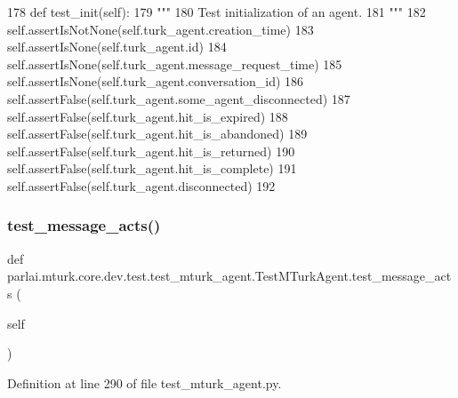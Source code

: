 \begin{DoxyCode}
178     \textcolor{keyword}{def }test\_init(self):
179         \textcolor{stringliteral}{"""}
180 \textcolor{stringliteral}{        Test initialization of an agent.}
181 \textcolor{stringliteral}{        """}
182         self.assertIsNotNone(self.turk\_agent.creation\_time)
183         self.assertIsNone(self.turk\_agent.id)
184         self.assertIsNone(self.turk\_agent.message\_request\_time)
185         self.assertIsNone(self.turk\_agent.conversation\_id)
186         self.assertFalse(self.turk\_agent.some\_agent\_disconnected)
187         self.assertFalse(self.turk\_agent.hit\_is\_expired)
188         self.assertFalse(self.turk\_agent.hit\_is\_abandoned)
189         self.assertFalse(self.turk\_agent.hit\_is\_returned)
190         self.assertFalse(self.turk\_agent.hit\_is\_complete)
191         self.assertFalse(self.turk\_agent.disconnected)
192 
\end{DoxyCode}
\mbox{\label{classparlai_1_1mturk_1_1core_1_1dev_1_1test_1_1test__mturk__agent_1_1TestMTurkAgent_ad7bb0c1f6343a03be96731bd27670b3b}} 
\subsubsection{\texorpdfstring{test\+\_\+message\+\_\+acts()}{test\_message\_acts()}}
{\footnotesize\ttfamily def parlai.\+mturk.\+core.\+dev.\+test.\+test\+\_\+mturk\+\_\+agent.\+Test\+M\+Turk\+Agent.\+test\+\_\+message\+\_\+acts (\begin{DoxyParamCaption}\item[{}]{self }\end{DoxyParamCaption})}



Definition at line 290 of file test\+\_\+mturk\+\_\+agent.\+py.


